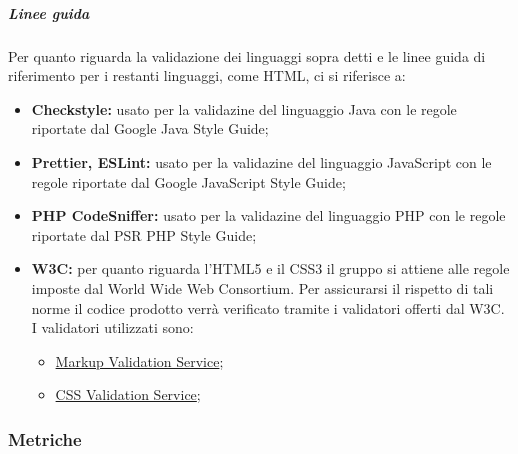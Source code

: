 					\subparagraph{Linee guida}
					Per quanto riguarda la validazione dei linguaggi sopra detti e le linee guida di riferimento per i restanti linguaggi, come HTML, ci si riferisce a:
					\begin{itemize}
						\item \textbf{Checkstyle:} usato per la validazine del linguaggio Java con le regole riportate dal Google Java Style Guide;
						\item \textbf{Prettier, ESLint:} usato per la validazine del linguaggio JavaScript con le regole riportate dal Google JavaScript Style Guide;
						\item \textbf{PHP CodeSniffer:} usato per la validazine del linguaggio PHP con le regole riportate dal PSR PHP Style Guide;						
						\item \textbf{W3C:} per quanto riguarda l’HTML5 e il CSS3 il gruppo si attiene alle regole imposte dal World Wide Web Consortium. Per assicurarsi il rispetto di tali norme il codice prodotto verrà verificato tramite i validatori offerti dal W3C. I validatori utilizzati sono:
						\begin{itemize}
							\item \href{https://validator.w3.org/}{Markup Validation Service};
							\item \href{https://jigsaw.w3.org/css-validator/}{CSS Validation Service};
						\end{itemize}
					\end{itemize}


		\subsubsection{Metriche}





